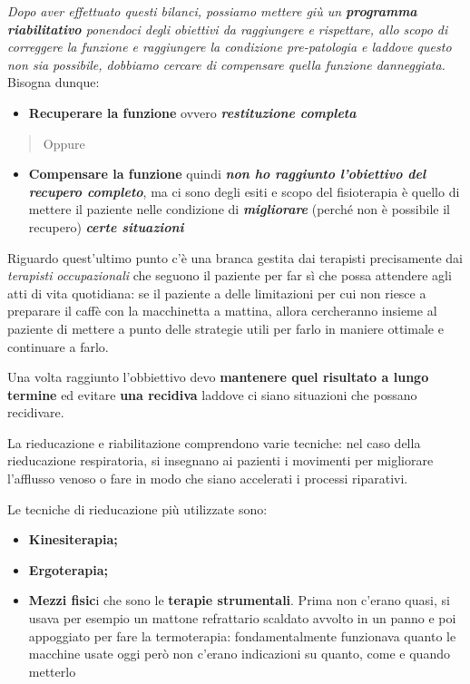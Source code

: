\emph{Dopo aver effettuato questi bilanci, possiamo mettere giù un \textbf{\emph{programma riabilitativo}} ponendoci degli obiettivi da raggiungere e rispettare, allo scopo di correggere la funzione e raggiungere la condizione pre-patologia e laddove questo non sia
possibile, dobbiamo cercare di compensare quella funzione danneggiata.}
Bisogna dunque:

\begin{itemize}
\item
  \textbf{Recuperare la funzione} ovvero \textbf{\emph{restituzione completa}}
\end{itemize}

\begin{quote}
Oppure
\end{quote}

\begin{itemize}
\item
  \textbf{Compensare la funzione} quindi \textbf{\emph{non ho raggiunto l'obiettivo del recupero completo}}, ma ci sono degli esiti e scopo del fisioterapia è quello di mettere il paziente nelle condizione di \textbf{\emph{migliorare}} (perché non è possibile il recupero) \textbf{\emph{certe situazioni}}
\end{itemize}

Riguardo quest'ultimo punto c'è una branca gestita dai terapisti precisamente dai \emph{terapisti} \emph{\emph{occupazionali}} che seguono il paziente per far sì che possa attendere agli atti di vita quotidiana: se il paziente a delle limitazioni per cui non riesce a
preparare il caffè con la macchinetta a mattina, allora cercheranno insieme al paziente di mettere a punto delle strategie utili per farlo in maniere ottimale e continuare a farlo.

Una volta raggiunto l'obbiettivo devo \textbf{mantenere quel risultato a lungo termine} ed evitare \textbf{una recidiva} laddove ci siano situazioni che possano recidivare.

La rieducazione e riabilitazione comprendono varie tecniche: nel caso della rieducazione respiratoria, si insegnano ai pazienti i movimenti per migliorare l'afflusso venoso o fare in modo che siano accelerati i
processi riparativi.

Le tecniche di rieducazione più utilizzate sono:

\begin{itemize}
\item
  \textbf{Kinesiterapia;}
\item
  \textbf{Ergoterapia;}
\item
  \textbf{Mezzi fisic}i che sono le \textbf{terapie strumentali}. Prima non c'erano quasi, si usava per esempio un mattone refrattario scaldato avvolto in un panno e poi appoggiato per fare la termoterapia: fondamentalmente funzionava quanto le macchine usate oggi però non c'erano indicazioni su quanto, come e quando metterlo
\end{itemize}

